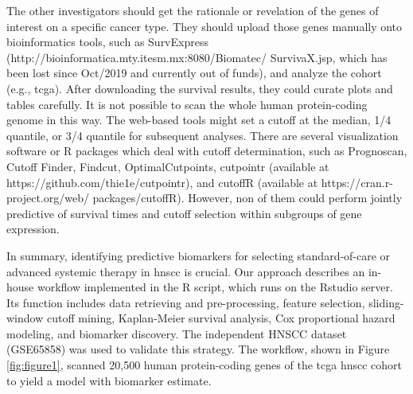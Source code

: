 \documentclass[jpm,article,submit,moreauthors,pdftex]{Definitions/mdpi}
\begin{document}
The other investigators should get the rationale or revelation of the genes of interest on a specific cancer type. They should upload those genes manually onto bioinformatics tools, such as SurvExpress (http://bioinformatica.mty.itesm.mx:8080/Biomatec/ \newline
SurvivaX.jsp\cite{Aguirre-Gamboa2013}, which has been lost since Oct/2019 and currently out of funds), and analyze the cohort (e.g., \acrshort{tcga}). After downloading the survival results, they could curate plots and tables carefully.
It is not possible to scan the whole human protein-coding genome in this way.
The web-based tools might set a cutoff at the median, 1/4 quantile, or 3/4 quantile for subsequent analyses. There are several visualization software or R packages which deal with cutoff determination\cite{Abel1984}, %
such as Prognoscan\cite{Mizuno2009a}, Cutoff Finder\cite{Budczies2012}, Findcut\cite{Chang2017a}, OptimalCutpoints\cite{Cristina2019},  cutpointr (available at https://github.com/thie1e/cutpointr), and cutoffR (available at https://cran.r-project.org/web/
packages/cutoffR). 
However, non of them could perform jointly predictive of survival times and cutoff selection within subgroups of gene expression.


In summary, identifying predictive biomarkers for selecting standard-of-care or advanced systemic therapy\cite{Cristina2019} in \acrshort{hnscc} is crucial.
Our approach describes an in-house workflow implemented in the R script, which runs on the Rstudio server.
Its function includes data retrieving and pre-processing, feature selection, sliding-window cutoff mining, Kaplan-Meier survival analysis, Cox proportional hazard modeling, and biomarker discovery.
The independent HNSCC dataset (GSE65858) was used to validate this strategy.
The workflow, shown in Figure \ref{fig:figure1}, scanned 20,500 human protein-coding genes of the \acrshort{tcga} \acrshort{hnscc} cohort to yield a model with biomarker estimate.

\end{document}
